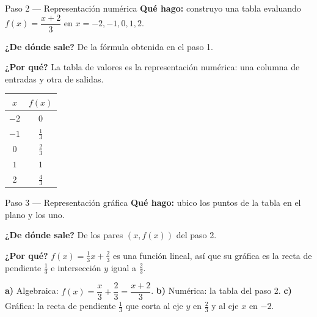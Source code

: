 \documentclass[11pt]{article}
\begin{document}
\begin{paso}{Paso 2 --- Representación numérica}
\textbf{Qué hago:} construyo una tabla evaluando $f(x)=\dfrac{x+2}{3}$ en $x=-2,-1,0,1,2$.

\textbf{¿De dónde sale?} De la fórmula obtenida en el paso 1.

\textbf{¿Por qué?} La tabla de valores es la representación numérica: una columna de entradas y otra de salidas.
\begin{center}
\begin{tabular}{|c|c|}
\hline
$x$ & $f(x)$ \\ \hline
$-2$ & $0$ \\
$-1$ & $\tfrac13$ \\
$0$ & $\tfrac23$ \\
$1$ & $1$ \\
$2$ & $\tfrac43$ \\ \hline
\end{tabular}
\end{center}
\end{paso}

\begin{paso}{Paso 3 --- Representación gráfica}
\textbf{Qué hago:} ubico los puntos de la tabla en el plano y los uno.

\textbf{¿De dónde sale?} De los pares $(x,f(x))$ del paso 2.

\textbf{¿Por qué?} $f(x)=\tfrac13 x+\tfrac23$ es una función lineal, así que su gráfica es la recta de pendiente $\tfrac13$ e intersección $y$ igual a $\tfrac23$.
\begin{center}
\end{center}
\end{paso}

\begin{resp}
\textbf{a)} Algebraica: $f(x)=\dfrac{x}{3}+\dfrac23=\dfrac{x+2}{3}$.\quad
\textbf{b)} Numérica: la tabla del paso 2.\quad
\textbf{c)} Gráfica: la recta de pendiente $\tfrac13$ que corta al eje $y$ en $\tfrac23$ y al eje $x$ en $-2$.
\end{resp}
\end{document}
